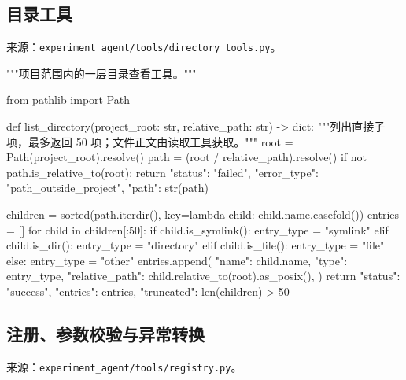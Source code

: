 \documentclass[UTF8,zihao=-4,fontset=fandol]{ctexart}
\begin{document}
\subsection{目录工具}

来源：\nolinkurl{experiment_agent/tools/directory_tools.py}。

\begin{Code}
"""项目范围内的一层目录查看工具。"""

from pathlib import Path


def list_directory(project_root: str, relative_path: str) -> dict:
    """列出直接子项，最多返回 50 项；文件正文由读取工具获取。"""
    root = Path(project_root).resolve()
    path = (root / relative_path).resolve()
    if not path.is_relative_to(root):
        return {"status": "failed", "error_type": "path_outside_project", "path": str(path)}

    children = sorted(path.iterdir(), key=lambda child: child.name.casefold())
    entries = []
    for child in children[:50]:
        if child.is_symlink():
            entry_type = "symlink"
        elif child.is_dir():
            entry_type = "directory"
        elif child.is_file():
            entry_type = "file"
        else:
            entry_type = "other"
        entries.append({
            "name": child.name,
            "type": entry_type,
            "relative_path": child.relative_to(root).as_posix(),
        })
    return {"status": "success", "entries": entries, "truncated": len(children) > 50}
\end{Code}

\subsection{注册、参数校验与异常转换}

来源：\nolinkurl{experiment_agent/tools/registry.py}。
\end{document}
